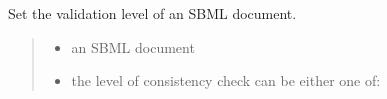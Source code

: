 \documentclass[letterpaper,12pt,english]{sphinxmanual}
\begin{document}

\begin{fulllineitems}
\label{\detokenize{api/io:cbmpy.CBXML.sbml_setValidationOptions}}
\pysigstartsignatures
\pysiglinewithargsret
{}
{\sphinxparamcomma {}}
{}
\pysigstopsignatures
\sphinxAtStartPar
Set the validation level of an SBML document.
\begin{quote}\begin{description}
\begin{itemize}
\item {} 
\sphinxAtStartPar
{} \textendash{} an SBML document

\item {} 
\sphinxAtStartPar
{} \textendash{} the level of consistency check can be either one of:

\end{itemize}

\end{description}\end{quote}

\end{fulllineitems}

\end{document}
